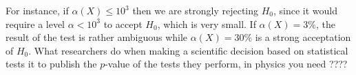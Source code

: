 \documentclass[
	fontsize=11pt, %
	twoside=false, %
	numbers=noenddot, %
]{kaobook}
\begin{document}
For instance, if $\alpha(X) \leq 10^3$ then we are strongly rejecting $H_0$, since it would require a level $\alpha < 10^3$ to accept $H_0$, which is very small. 
If $\alpha(X) = 3\%$, the result of the test is rather ambiguous while $\alpha(X) = 30\%$ is a strong acceptation of $H_0$.
What researchers  do when making a scientific decision based on statistical tests it to publish the $p$-value of the tests they perform, in physics you need ???? 




\end{document}
